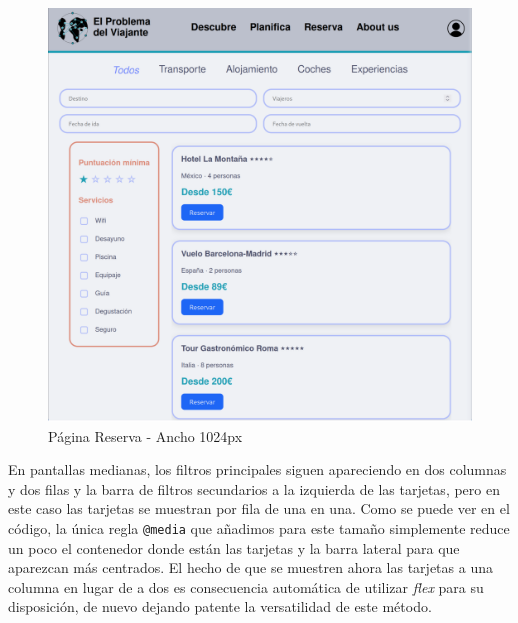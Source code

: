 \documentclass[11pt, a4paper]{book}
\begin{document}
    \begin{figure} [H]
		\centering
		\includegraphics[height=0.4\textheight]{CSS/5-3 1024.png}
		\caption{Página Reserva - Ancho 1024px}
	\end{figure}

    En pantallas medianas, los filtros principales siguen apareciendo en dos columnas y dos filas y la barra de filtros secundarios a la izquierda de las tarjetas, pero en este caso las tarjetas se muestran por fila de una en una. Como se puede ver en el código, la única regla \texttt{@media} que añadimos para este tamaño simplemente reduce un poco el contenedor donde están las tarjetas y la barra lateral para que aparezcan más centrados. El hecho de que se muestren ahora las tarjetas a una columna en lugar de a dos es consecuencia automática de utilizar \textit{flex} para su disposición, de nuevo dejando patente la versatilidad de este método.
	
	\newpage
	
\end{document}
